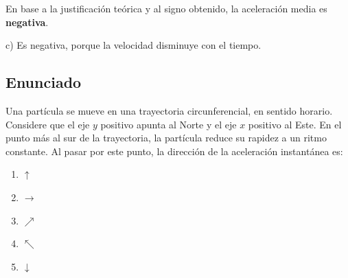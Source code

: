 \documentclass[12pt, a4paper]{article}
\begin{document}
En base a la justificación teórica y al signo obtenido, la aceleración media es \textbf{negativa}.

\begin{tcolorbox}[colback=green!5!white, colframe=green!50!black, title=Respuesta Final]
\centering \Large c) Es negativa, porque la velocidad disminuye con el tiempo.
\end{tcolorbox}

\newpage

\subsection*{Enunciado}
Una partícula se mueve en una trayectoria circunferencial, en sentido horario. Considere que el eje $y$ positivo apunta al Norte y el eje $x$ positivo al Este. En el punto más al sur de la trayectoria, la partícula reduce su rapidez a un ritmo constante. Al pasar por este punto, la dirección de la aceleración instantánea es:

\begin{enumerate}[label=\alph*)]
    \item $\uparrow$
    \item $\rightarrow$
    \item $\nearrow$
    \item $\nwarrow$
    \item $\downarrow$
\end{enumerate}

\begin{center}
\end{center}
\end{document}
